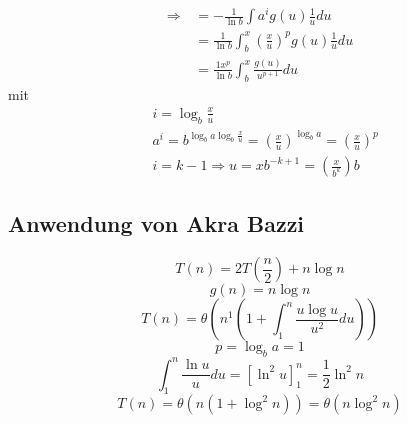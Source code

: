 \begin{align*}
\Rightarrow\,&=-\frac{1}{\ln b}\int a^ig(u)\frac{1}{u}du\\
&=\frac{1}{\ln b}\int_b^x(\frac{x}{u})^pg(u)\frac{1}{u}du\\
&=\frac{1x^p}{\ln b}\int_b^x\frac{g(u)}{u^{p+1}}du
\end{align*}
mit
\begin{align*}
&i=\log_b\frac{x}{u}\\
&a^i=b^{\log_ba\log_b\frac{x}{u}}=(\frac{x}{u})^{\log_ba}=(\frac{x}{u})^p\\
&i=k-1\Rightarrow u=xb^{-k+1}=(\frac{x}{b^k})b
\end{align*}

\subsection{Anwendung von Akra Bazzi}
$$T(n)=2T(\frac{n}{2})+n\log n$$
$$g(n)=n\log n$$
$$T(n)=\theta (n^1(1+\int_1^n\frac{u\log u}{u^2}du))$$
$$p=\log_ba=1$$
$$\int_1^n\frac{\ln u}{u}du=[\ln^2u]_1^n=\frac{1}{2}\ln^2n$$
$$T(n)=\theta(n(1+\log^2n))=\theta(n\log^2n)$$
